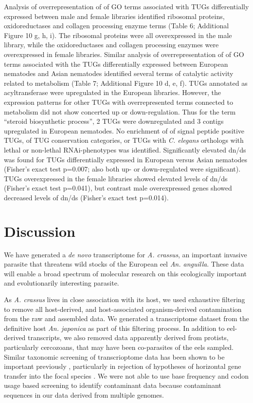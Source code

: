 \documentclass[10pt]{bmc_article}
\newenvironment{bmcformat}{\begin{raggedright}\baselineskip20pt\sloppy\setboolean{publ}{false}}{\end{raggedright}\baselineskip20pt\sloppy}
\begin{document}
\begin{bmcformat}
Analysis of overrepresentation of of GO terms associated with TUGs
differentially expressed between male and female libraries identified
ribosomal proteins, oxidoreductases and collagen processing enzyme
terms (Table 6; Additional Figure 10 g, h, i). The ribosomal proteins were
all overexpressed in the male library, while the oxidoreductases and
collagen processing enzymes were overexpressed in female
libraries. Similar analysis of overrepresentation of of GO terms
associated with the TUGs differentially expressed between European
nematodes and Asian nematodes identified several terms of catalytic
activity related to metabolism (Table 7; Additional Figure 10
d, e, f). TUGs annotated as acyltransferase were upregulated in the
European libraries. However, the expression patterns for other TUGs
with overrepresented terms connected to metabolism did not show
concerted up or down-regulation. Thus for the term ``steroid
biosynthetic process'', 2 TUGs were downregulated and 3 contigs
upregulated in European nematodes. No enrichment of of signal peptide
positive TUGs, of TUG conservation categories, or TUGs with
\textit{C. elegans} orthologs with lethal or non-lethal
RNAi-phenotypes was identified. Significantly elevated dn/ds was found
for TUGs differentially expressed in European versus Asian nematodes
(Fisher's exact test p=0.007; also both up- or down-regulated were
significant). TUGs overexpressed in the female libraries showed
elevated levels of dn/ds (Fisher's exact test p=0.041), but contrast
male overexpressed genes showed decreased levels of dn/ds (Fisher's
exact test p=0.014).


\section*{Discussion}

We have generated a \textit{de novo} transcriptome for
\textit{A. crassus}, an important invasive parasite that threatens
wild stocks of the European eel \textit{An. anguilla}. These data will
enable a broad spectrum of molecular research on this ecologically
important and evolutionarily interesting parasite.

As \textit{A. crassus} lives in close association with its host, we
used exhaustive filtering to remove all host-derived, and
host-associated organism-derived contamination from the raw and
assembled data. We generated a transcriptome dataset from the
definitive host \textit{An. japonica} as part of this filtering
process. In addition to eel-derived transcripts, we also removed data
apparently derived from protists, particularly cercozoans, that may
have been co-parasites of the eels sampled. Similar taxonomic
screening of transcrioptome data has been shown to be important
previously \cite{pmid21138572}, particularly in rejection of
hypotheses of horizontal gene transfer into the focal species
\cite{pmid20386959}. We were not able to use base frequency and codon
usage based screening to identify contaminant data \cite{pmid20034392,
  pmid17218127} because contaminant sequences in our data derived from
multiple genomes.



\end{bmcformat}
\end{document}

